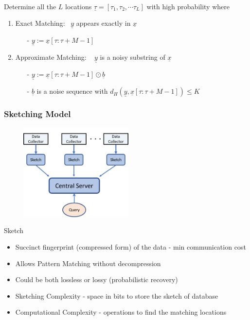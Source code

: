 \documentclass[10pt,xcolor=table]{beamer}
\newcommand{\xv}{\underline{x}}
\newcommand{\bv}{\underline{b}}
\newcommand{\yv}{\underline{y}}
\begin{document}
\begin{frame}
\vspace{-3pt}
\pause
\begin{block}{}
Determine all the {\color{blue} $L$ locations} $\underline{\tau} = [\tau_1, \tau_2, \cdots \tau_L]$ with  {\color{blue}high probability}  where
	\begin{enumerate}
		\item \alert{Exact Matching}:~  $\yv$ appears {\color{blue}exactly} in $\xv$
		\begin{itemize}
				\item [-]  $\yv := \xv[\tau:\tau+M-1]$
		\end{itemize}
        \pause
		\item \alert{Approximate Matching:} ~ $\yv$ is a {\color{blue}noisy substring} of $\xv$
		\begin{itemize}\itemsep3pt
				\item [-] $\yv := \xv[\tau:\tau+M-1] \odot \bv$
				\item [-] $\bv$ is a noise sequence with $d_H(\yv,\xv[\tau:\tau+M-1]) \leq K$
		\end{itemize}
	\end{enumerate}

	\end{block}
	 \end{frame}

\begin{frame} \frametitle{Sketching Model}
		\vspace{-10pt}
	\begin{figure}
		\includegraphics[width=2.25in]{SketchingModel.pdf}
	\end{figure}
	\vspace{-8pt}
	\begin{block}{Sketch}
		\begin{itemize}
			\item Succinct fingerprint (compressed form) of the data - min communication cost
			\item Allows Pattern Matching without decompression
			\item Could be both lossless or lossy (probabilistic recovery)
			\item \alert{Sketching Complexity} - space in bits to store the sketch of database
            \item \alert{Computational Complexity} - operations to find the matching locations
		\end{itemize}
	\end{block}
\end{frame}
\end{document}
